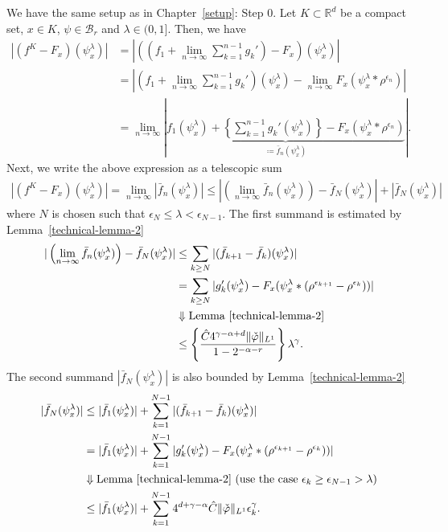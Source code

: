 We have the same setup as in Chapter~\ref{setup}: Step 0. Let \(K \subset \mathbb{R}^d\) be a compact set, \(x \in K\), \(\psi \in \mathcal{B}_r\) and \(\lambda \in (0,1]\). Then, we have
\begin{align*}
    |(f^K - F_x)(\psi_x^\lambda)|
    &= |((f_1 + \lim_{n\to \infty}\sum_{k=1}^{n-1}g_k') - F_x)(\psi_x^\lambda)| \\
    &= |(f_1 + \lim_{n\to \infty}\sum_{k=1}^{n-1}g_k')(\psi_x^\lambda) - \lim_{n\to \infty} F_x(\psi_x^\lambda* \rho^{\epsilon_n})| \\
    &= \lim_{n \to \infty} |\underbrace{f_1(\psi_x^\lambda) + \left\{ \sum_{k=1}^{n-1}g_k'(\psi_x^\lambda) \right\} - F_x(\psi_x^\lambda* \rho^{\epsilon_n})}_{\coloneqq \bar f_n(\psi_x^\lambda)}|.
\end{align*}  
Next, we write the above expression as a telescopic sum 
\begin{align*}
    |(f^K - F_x)(\psi_x^\lambda)| = 
    \lim_{n \to \infty} |\bar f_n(\psi_x^\lambda)| \leq 
    | \left ( \lim_{n \to \infty} \bar f_n(\psi_x^\lambda) \right ) - \bar f_N(\psi_x^\lambda)|
    + |\bar f_N(\psi_x^\lambda)|
\end{align*}
where \(N\) is chosen such that \(\epsilon_N \leq \lambda < \epsilon_{N - 1}\). The first summand is estimated by Lemma~\ref{technical-lemma-2}
\begin{align*}
    | \left( \lim_{n \to \infty} \bar f_n(\psi_x^\lambda)  \right) - \bar f_N(\psi_x^\lambda)| &\leq
    \sum_{k \geq N} |(\bar f_{k+1} - \bar f_{k})(\psi_x^\lambda)|\\ &= 
    \sum_{k \geq N} |g_k'(\psi^\lambda_x) - F_x(\psi^\lambda_x*(\rho^{\epsilon_{k+1}}-\rho^{\epsilon_k}))| \\
    &\Downarrow \text{Lemma~\ref{technical-lemma-2}} \\
    &\leq \left \{ \frac{\hat C 4^{\gamma - \alpha + d} \lVert \check \varphi \rVert_{L^1} }{1-2^{-\alpha - r}} \right \} \lambda^{\gamma}.
\end{align*}
The second summand \(|\bar f_N(\psi_x^\lambda)|\) is also bounded by Lemma~\ref{technical-lemma-2}
\begin{align*}
    |\bar f_N(\psi_x^\lambda)| &\leq |\bar f_1(\psi_x^\lambda)| + \sum^{N-1}_{k=1} |(\bar f_{k+1}  - \bar f_k)(\psi_x^\lambda)|\\
    &= |\bar f_1(\psi_x^\lambda)| + \sum^{N-1}_{k=1} |g_k'(\psi^\lambda_x) - F_x(\psi^\lambda_x*(\rho^{\epsilon_{k+1}}-\rho^{\epsilon_k}))| \\
    &\Downarrow \parbox{25em}{Lemma~\ref{technical-lemma-2} (use the case \(\epsilon_k \geq \epsilon_{N-1} > \lambda\))}\\
    &\leq  |\bar f_1(\psi_x^\lambda)| + \sum^{N-1}_{k=1} 4^{d+\gamma-\alpha}\hat C \lVert \check \varphi \rVert_{L^1} \epsilon^\gamma_k.
\end{align*}
